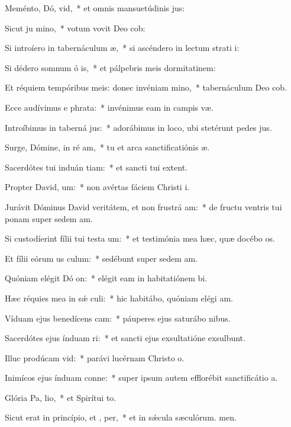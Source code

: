 \item Meménto, Dó, vid,~* et omnis mansuetúdinis jus:
\item Sicut ju mino,~* votum vovit Deo cob:
\item Si introíero in tabernáculum  æ,~* si ascéndero in lectum strati i:
\item Si dédero somnum ó is,~* et pálpebris meis dormitatinem:
\item Et réquiem tempóribus meis: donec invéniam  mino,~* tabernáculum Deo cob.
\item Ecce audívimus e  phrata:~* invénimus eam in campis væ.
\item Introíbimus in taberná jus:~* adorábimus in loco, ubi stetérunt pedes jus.
\item Surge, Dómine, in ré am,~* tu et arca sanctificatiónis æ.
\item Sacerdótes tui induán tiam:~* et sancti tui extent.
\item Propter David,  um:~* non avértas fáciem Christi i.
\item Jurávit Dóminus David veritátem, et non frustrá am:~* de fructu ventris tui ponam super sedem am.
\item Si custodíerint fílii tui testa um:~* et testimónia mea hæc, quæ docébo os.
\item Et fílii eórum us  culum:~* sedébunt super sedem am.
\item Quóniam elégit Dó on:~* elégit eam in habitatiónem bi.
\item Hæc réquies mea in sǽ culi:~* hic habitábo, quóniam elégi am.
\item Víduam ejus benedícens cam:~* páuperes ejus saturábo nibus.
\item Sacerdótes ejus índuam ri:~* et sancti ejus exsultatióne exsulbunt.
\item Illuc prodúcam  vid:~* parávi lucérnam Christo o.
\item Inimícos ejus índuam conne:~* super ipsum autem efflorébit sanctificátio a.
\item Glória Pa,  lio,~* et Spirítui to.
\item Sicut erat in princípio, et ,  per,~* et in sǽcula sæculórum. men.
